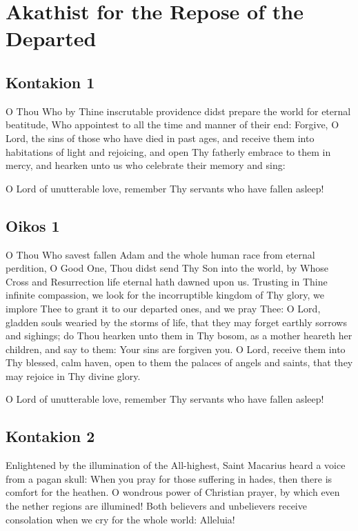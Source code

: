 \section{Akathist for the Repose of the Departed}

\subsection{Kontakion 1}

O Thou Who by Thine inscrutable providence didst prepare the world for eternal beatitude, Who appointest to all the time and manner of their end: Forgive, O Lord, the sins of those who have died in past ages, and receive them into habitations of light and rejoicing, and open Thy fatherly embrace to them in mercy, and hearken unto us who celebrate their memory and sing:

O Lord of unutterable love, remember Thy servants who have fallen asleep!

\subsection{Oikos 1}

O Thou Who savest fallen Adam and the whole human race from eternal perdition, O Good One, Thou didst send Thy Son into the world, by Whose Cross and Resurrection life eternal hath dawned upon us. Trusting in Thine infinite compassion, we look for the incorruptible kingdom of Thy glory, we implore Thee to grant it to our departed ones, and we pray Thee: O Lord, gladden souls wearied by the storms of life, that they may forget earthly sorrows and sighings; do Thou hearken unto them in Thy bosom, as a mother heareth her children, and say to them: Your sins are forgiven you. O Lord, receive them into Thy blessed, calm haven, open to them the palaces of angels and saints, that they may rejoice in Thy divine glory.

O Lord of unutterable love, remember Thy servants who have fallen asleep!

\subsection{Kontakion 2}

Enlightened by the illumination of the All-highest, Saint Macarius heard a voice from a pagan skull: When you pray for those suffering in hades, then there is comfort for the heathen. O wondrous power of Christian prayer, by which even the nether regions are illumined! Both believers and unbelievers receive consolation when we cry for the whole world: Alleluia!

